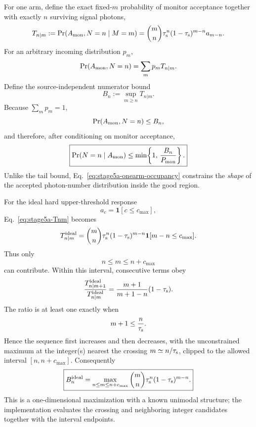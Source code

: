 \documentclass[11pt]{article}
\theoremstyle{remark}
\begin{document}
For one arm, define the exact fixed-\(m\) probability of monitor acceptance
together with exactly \(n\) surviving signal photons,
\begin{equation}
    T_{n|m}
    :=
    \Pr(A_{\rm mon},N=n\mid M=m)
    =
    \binom mn
    \tau_{\rm s}^{n}
    (1-\tau_{\rm s})^{m-n}
    a_{m-n}.
    \label{eq:stage5a-Tnm}
\end{equation}
For an arbitrary incoming distribution \(p_m\),
\begin{equation}
    \Pr(A_{\rm mon},N=n)
    =
    \sum_m p_mT_{n|m}.
    \label{eq:stage5a-exact-n-numerator}
\end{equation}
Define the source-independent numerator bound
\begin{equation}
    \boxed{
    B_n
    :=
    \sup_{m\ge n}T_{n|m}.
    }
    \label{eq:stage5a-Bn-general}
\end{equation}
Because \(\sum_mp_m=1\),
\begin{equation}
    \Pr(A_{\rm mon},N=n)
    \le
    B_n,
\end{equation}
and therefore, after conditioning on monitor acceptance,
\begin{equation}
    \boxed{
    \Pr(N=n\mid A_{\rm mon})
    \le
    \min\!\left\{
      1,\,
      \frac{B_n}{P_{\rm mon}}
    \right\}.
    }
    \label{eq:stage5a-onearm-occupancy}
\end{equation}
Unlike the tail bound, Eq.~\eqref{eq:stage5a-onearm-occupancy} constrains the
\emph{shape} of the accepted photon-number distribution inside the good
region.

For the ideal hard upper-threshold response
\[
    a_c=\mathbf 1[c\le c_{\max}],
\]
Eq.~\eqref{eq:stage5a-Tnm} becomes
\begin{equation}
    T_{n|m}^{\rm ideal}
    =
    \binom mn
    \tau_{\rm s}^{n}
    (1-\tau_{\rm s})^{m-n}
    \mathbf 1[m-n\le c_{\max}].
    \label{eq:stage5a-Tnm-ideal}
\end{equation}
Thus only
\begin{equation}
    n\le m\le n+c_{\max}
    \label{eq:stage5a-m-range-fixed-n}
\end{equation}
can contribute.  Within this interval, consecutive terms obey
\begin{equation}
    \frac{
      T_{n|m+1}^{\rm ideal}
    }{
      T_{n|m}^{\rm ideal}
    }
    =
    \frac{m+1}{m+1-n}
    (1-\tau_{\rm s}).
    \label{eq:stage5a-T-ratio}
\end{equation}
The ratio is at least one exactly when
\[
    m+1\le \frac{n}{\tau_{\rm s}}.
\]
Hence the sequence first increases and then decreases, with the unconstrained
maximum at the integer(s) nearest the crossing \(m\simeq n/\tau_{\rm s}\),
clipped to the allowed interval
\([n,n+c_{\max}]\).  Consequently
\begin{equation}
    \boxed{
    B_n^{\rm ideal}
    =
    \max_{n\le m\le n+c_{\max}}
    \binom mn
    \tau_{\rm s}^{n}
    (1-\tau_{\rm s})^{m-n}.
    }
    \label{eq:stage5a-Bn-ideal}
\end{equation}
This is a one-dimensional maximization with a known unimodal structure; the
implementation evaluates the crossing and neighboring integer candidates
together with the interval endpoints.
\end{document}
